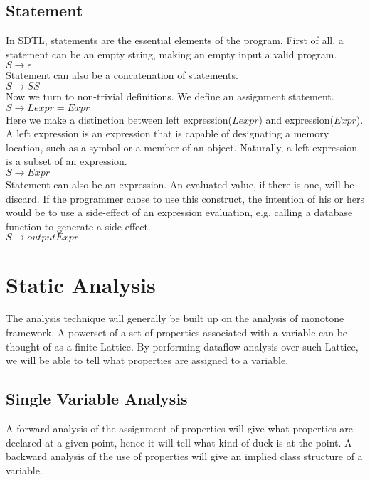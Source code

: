 \documentclass[a4paper,12pt]{article}
\begin{document}
\subsection{Statement}
In SDTL, statements are the essential elements of the program. First of all, a statement can be an empty string, making an empty input a valid program.\\
$S \rightarrow \epsilon$\\
Statement can also be a concatenation of statements.\\
$S \rightarrow S S$\\
Now we turn to non-trivial definitions. We define an assignment statement.\\
$S \rightarrow Lexpr = Expr$\\
Here we make a distinction between left expression($Lexpr$) and expression($Expr$). A left expression is an expression that is capable of designating a memory location, such as a symbol or a member of an object. Naturally, a left expression is a subset of an expression.\\
$S \rightarrow Expr$\\
Statement can also be an expression. An evaluated value, if there is one, will be discard. If the programmer chose to use this construct, the intention of his or hers would be to use a side-effect of an expression evaluation, e.g. calling a database function to generate a side-effect.\\
$S \rightarrow output Expr$\\

\section{Static Analysis}
The analysis technique will generally be built up on the analysis of monotone framework. A powerset of a set of properties associated with a variable can be thought of as a finite Lattice. By performing dataflow analysis over such Lattice, we will be able to tell what properties are assigned to a variable.\\
\subsection{Single Variable Analysis}
A forward analysis of the assignment of properties will give what properties are declared at a given point, hence it will tell what kind of duck is at the point. A backward analysis of the use of properties will give an implied class structure of a variable.\\
\end{document}
